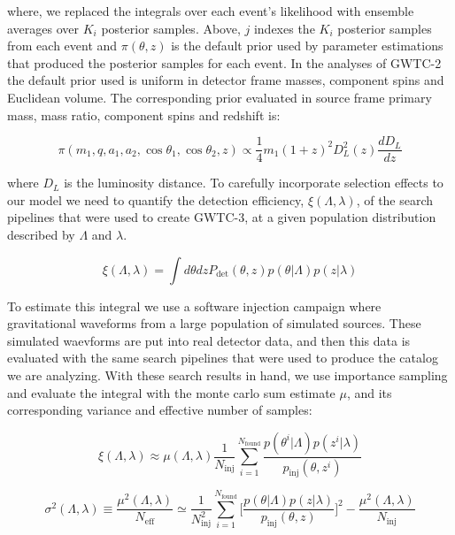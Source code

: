 \noindent
where, we replaced the integrals over each event's likelihood with ensemble averages over $K_i$ posterior samples. Above, $j$
indexes the $K_i$ posterior samples from each event and $\pi(\theta, z)$ is the default prior used by parameter estimations that 
produced the posterior samples for each event. In the analyses of GWTC-2 the default prior used is uniform in detector frame masses, 
component spins and Euclidean volume. The corresponding prior evaluated in source frame primary mass, mass ratio, component spins 
and redshift is:

\begin{equation}
    \pi(m_1, q, a_1, a_2, \cos{\theta_1}, \cos{\theta_2}, z) \propto \frac{1}{4} m_1 (1+z)^2 D_L^2(z) \frac{dD_L}{dz}
\end{equation}

\noindent where $D_L$ is the luminosity distance. To carefully incorporate selection effects to our model we need to quantify the detection efficiency,
$\xi(\Lambda, \lambda)$, of the search pipelines that were used to create GWTC-3, at a given population distribution described by $\Lambda$ and $\lambda$.
 
\begin{equation}
     \xi(\Lambda, \lambda) = \int d\theta dz P_\mathrm{det}(\theta, z)p(\theta | \Lambda) p(z | \lambda)
\end{equation}
 
\noindent
To estimate this integral we use a software injection campaign where gravitational waveforms from a large population of simulated sources. 
These simulated waevforms are put into real detector data, and then this data is evaluated with the same search pipelines that were used to 
produce the catalog we are analyzing. With these search results in hand, we use importance sampling and evaluate the integral 
with the monte carlo sum estimate $\mu$, and its corresponding variance and effective number of samples:

\begin{equation} \label{xi}
     \xi(\Lambda, \lambda) \approx \mu(\Lambda, \lambda) \frac{1}{N_\mathrm{inj}} \sum_{i=1}^{N_\mathrm{found}} \frac{p(\theta^i | \Lambda) p(z^i | \lambda)}{p_\mathrm{inj}(\theta, z^i)}
\end{equation}

\begin{equation}
    \sigma^2(\Lambda, \lambda) \equiv \frac{\mu^2(\Lambda, \lambda)}{N_\mathrm{eff}} \simeq \frac{1}{N^2_\mathrm{inj}} \sum_{i=1}^{N_\mathrm{found}} \bigg[\frac{p(\theta | \Lambda) p(z | \lambda)}{p_\mathrm{inj}(\theta, z)}\bigg]^2 - \frac{\mu^2(\Lambda, \lambda)}{N_\mathrm{inj}}
\end{equation}

